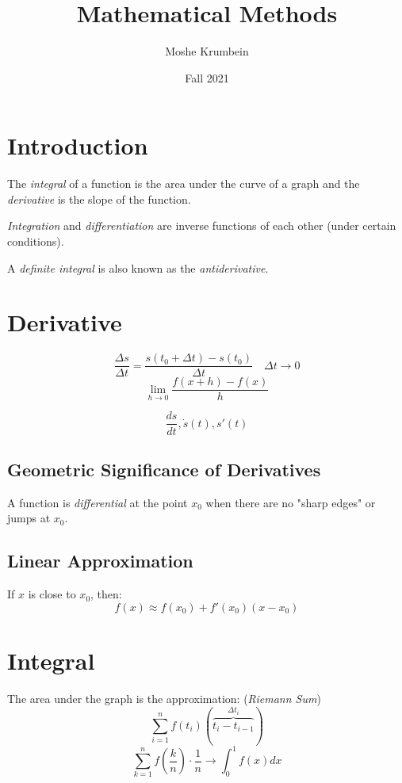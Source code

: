 \documentclass[00_complete]{subfiles}
\title{Mathematical Methods}
\author{Moshe Krumbein}
\date{Fall 2021}
\begin{document}

\section{Introduction}

The \emph{integral} of a function is the area under the curve of a graph and the
\emph{derivative} is the slope of the function.

\begin{definition}
\emph{Integration} and \emph{differentiation} are inverse functions of each other (under
certain conditions).

A \emph{definite integral} is also known as the \emph{antiderivative}.
\end{definition}
\section{Derivative}

\begin{definition}[Derivative]
\[
    \frac{\Delta s}{\Delta t} = \frac{s(t_0+\Delta t)-s(t_0)}{\Delta t}
    \quad \Delta t \to 0
\]
$$\lim\limits_{h \to 0} \frac{f(x+h)-f(x)}{h}$$
\end{definition}


\begin{symbols}[Derivative]
    $$\frac{ds}{dt}, \dot s(t), s'(t)$$
\end{symbols}

\subsection{Geometric Significance of Derivatives}

A function is \emph{differential} at the point $x_0$ when there are no "sharp edges"
or jumps at $x_0$.

\subsection{Linear Approximation}

If $x$ is close to $x_0$, then:
$$f(x) \approx f(x_0)+f'(x_0)(x-x_0)$$

\section{Integral}

The area under the graph is the approximation: (\emph{Riemann Sum})
$$\sum_{i=1}^{n}f(t_i)(\overbrace{t_i-t_{i-1}}^{\Delta t_i})$$
$$\sum_{k=1}^{n}f\left(\frac{k}{n}\right)\cdot \frac{1}{n} \to
\int_{0}^{1}f(x)dx$$
\end{document}

